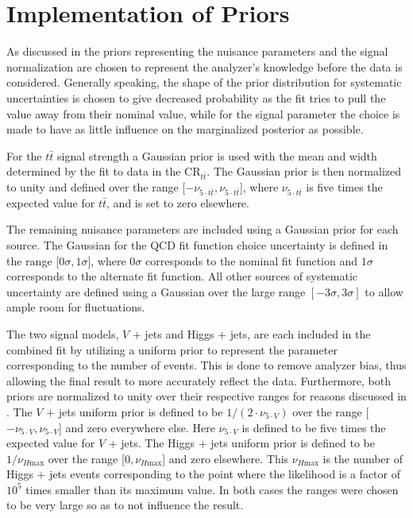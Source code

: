 \section{Implementation of Priors} \label{sec:fit:priors}

As discussed in  the priors representing the nuisance
parameters and the signal normalization are chosen to represent the analyzer's
knowledge before the data is considered. Generally speaking, the shape of the
prior distribution for systematic uncertainties is chosen to give decreased
probability as the fit tries to pull the value away from their nominal value,
while for the signal parameter the choice is made to have as little influence
on the marginalized posterior as possible.

For the $t\bar{t}$ signal strength a Gaussian prior is used with the mean and
width determined by the fit to data in the $\text{CR}_{t\bar{t}}$.  The
Gaussian prior is then normalized to unity and defined over the range [$-\nu_{5
\cdot t\bar{t}}, \nu_{5 \cdot t\bar{t}}$], where $\nu_{5 \cdot t\bar{t}}$ is five
times the expected value for $t\bar{t}$, and is set to zero elsewhere.

The remaining nuisance parameters are included using a Gaussian prior for each
source.  The Gaussian for the QCD fit function choice uncertainty is defined in
the range [$0\sigma, 1\sigma$], where $0\sigma$ corresponds to the nominal fit
function and $1\sigma$ corresponds to the alternate fit function.  All other
sources of systematic uncertainty are defined using a Gaussian over the large
range $[-3\sigma, 3\sigma]$ to allow ample room for fluctuations.
 
The two signal models, $V$ + jets and Higgs + jets, are each included in the
combined fit by utilizing a uniform prior to represent the parameter corresponding
to the number of events.  This is done to remove analyzer bias, thus allowing
the final result to more accurately reflect the data.  Furthermore, both priors
are normalized to unity over their respective ranges for reasons discussed in
. The $V$ + jets uniform prior is defined to be $1/(2 \cdot
\nu_{5 \cdot V})$ over the range [$-\nu_{5 \cdot V}, \nu_{5 \cdot V}$] and zero
everywhere else. Here $\nu_{5 \cdot V}$ is defined to be five times the expected
value for $V$ + jets. The Higgs + jets uniform prior is defined to be
$1/\nu_{H\text{max}}$ over the range [$0,\nu_{H\text{max}}$] and zero elsewhere.  This
$\nu_{H\text{max}}$ is the number of Higgs + jets events corresponding to the point
where the likelihood is a factor of $10^{5}$ times smaller than its maximum
value.  In both cases the ranges were chosen to be very large so as to not
influence the result.
